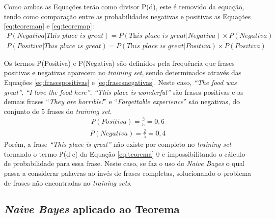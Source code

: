 Como ambas as Equações terão como divisor P(d), este é removido da equação, tendo como
comparação entre as probabilidades negativas e positivas as Equações
\ref{eq:teoreman} e \ref{eq:teoremap}:
\begin{equation}
\begin{gathered}
P(Negativa|\textit{This place is great})
=
P(\textit{This place is great}|Negativa) \times
P(Negativa)
\label{eq:teoreman}
\end{gathered}
\end{equation}
\begin{equation}
\begin{gathered}
P(Positiva|\textit{This place is great})
=
P(\textit{This place is great}|Positiva) \times
P(Positiva)
\label{eq:teoremap}
\end{gathered}
\end{equation}

Os termos P(Positiva) e P(Negativa) são definidos pela frequência que frases
positivas e negativas aparecem no \textit{training set}, sendo determinados
através das Equações \ref{eq:frasespositivas} e \ref{eq:frasesnegativas}. Neste
caso, \textit{``The food was great''}, \textit{``I love the food here''}, \textit{``This place is
wonderful''} são frases positivas e as demais frases ``\textit{They are horrible!}'' e
``\textit{Forgettable experience}'' são negativas, do conjunto de 5 frases do 
\textit{training set}.
\begin{equation}
\begin{gathered}
P(Positiva)
=
\frac{3}{5} = 0,6
\label{eq:frasespositivas}
\end{gathered}
\end{equation}
\begin{equation}
\begin{gathered}
P(Negativa)
=
\frac{2}{5} = 0,4
\label{eq:frasesnegativas}
\end{gathered}
\end{equation}
Porém, a frase \textit{``This place is great''} não existe por completo no
\textit{training set} tornando o termo P(d$\vert$c) da Equação
\ref{eq:teorema} 0 e impossibilitando o cálculo de probabilidade para essa frase.
Neste caso, se faz o uso do \textit{Naive Bayes} o qual passa a
considerar palavras ao invés de frases completas, solucionando o problema de
frases não encontradas no \textit{training sets}.

\subsection{\textit{Naive Bayes} aplicado ao Teorema}

